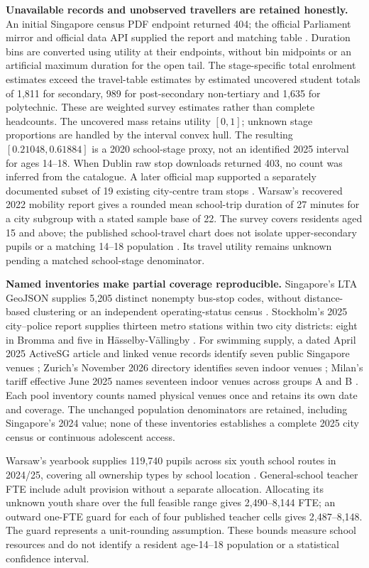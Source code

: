 \textbf{Unavailable records and unobserved travellers are retained honestly.}
An initial Singapore census PDF endpoint returned 404; the official Parliament
mirror and official data API supplied the report and matching table
\cite{singapore}. Duration bins are converted using utility at their endpoints,
without bin midpoints or an artificial maximum duration for the open tail.
The stage-specific total enrolment estimates exceed the travel-table estimates
by estimated uncovered student totals of 1,811 for secondary, 989 for
post-secondary non-tertiary and 1,635 for polytechnic. These are weighted
survey estimates rather than complete headcounts. The uncovered mass retains
utility $[0,1]$; unknown stage proportions are
handled by the interval convex hull. The resulting $[0.21048,0.61884]$ is a
2020 school-stage proxy, not an identified 2025 interval for ages 14--18.
When Dublin raw stop downloads returned 403, no count was inferred from the
catalogue. A later official map supported a separately documented subset of
19 existing city-centre tram stops \cite{dublin}. Warsaw's recovered 2022
mobility report gives a rounded mean school-trip duration of 27 minutes for a
city subgroup with a stated sample base of 22. The survey covers residents aged
15 and above; the published school-travel chart does not isolate upper-secondary
pupils or a matching 14--18 population \cite{warsaw2022}. Its travel utility
remains unknown pending a matched school-stage denominator.

\textbf{Named inventories make partial coverage reproducible.}
Singapore's LTA GeoJSON supplies 5,205 distinct nonempty bus-stop codes,
without distance-based clustering or an independent operating-status census
\cite{sgbus_lta}. Stockholm's 2025 city--police report supplies thirteen metro
stations within two city districts: eight in Bromma and five in
H\"asselby-V\"allingby \cite{stockholmmetro2025}.
For swimming supply, a dated April 2025 ActiveSG article and linked venue
records identify seven public Singapore venues \cite{sgpool_2025};
Zurich's November 2026 directory identifies seven indoor venues
\cite{zurichpool}; Milan's tariff effective June 2025 names seventeen indoor
venues across groups A and B \cite{milanpool2025}. Each pool inventory counts
named physical venues once and retains its own date and coverage. The unchanged
population denominators are retained, including Singapore's 2024 value;
none of these inventories establishes a complete 2025 city census or
continuous adolescent access.

Warsaw's yearbook supplies 119,740 pupils across six youth school routes
in 2024/25, covering all ownership types by school location
\cite{warsawedu2025}. General-school teacher FTE include adult provision
without a separate allocation. Allocating its unknown youth share over the
full feasible range gives 2,490--8,144 FTE; an outward one-FTE guard for each
of four published teacher cells gives 2,487--8,148. The guard represents a
unit-rounding assumption. These bounds measure school resources and do not
identify a resident age-14--18 population or a statistical confidence interval.

